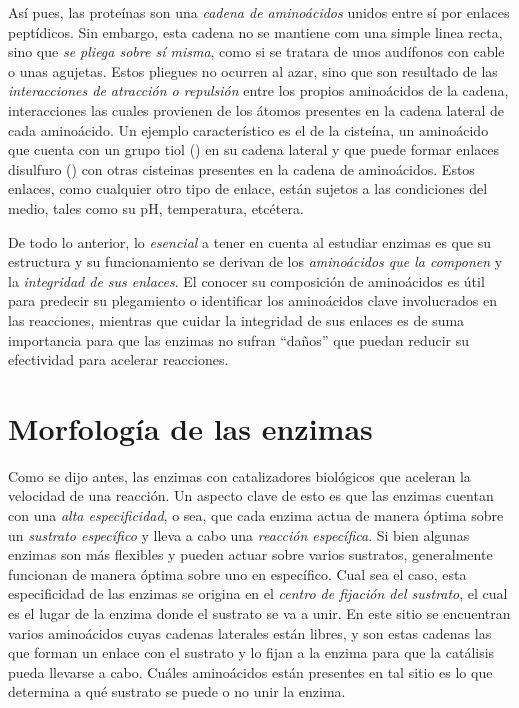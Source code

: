 Así pues, las proteínas son una \emph{cadena de aminoácidos} unidos entre sí por enlaces peptídicos. Sin embargo, esta cadena no se mantiene com una simple linea recta, sino que \emph{se pliega sobre sí misma}, como si se tratara de unos audífonos con cable o unas agujetas. Estos pliegues no ocurren al azar, sino que son resultado de las \emph{interacciones de atracción o repulsión} entre los propios aminoácidos de la cadena, interacciones las cuales provienen de los átomos presentes en la cadena lateral de cada aminoácido. Un ejemplo característico es el de la cisteína, un aminoácido que cuenta con un grupo tiol () en su cadena lateral y que puede formar enlaces disulfuro () con otras cisteinas presentes en la cadena de aminoácidos. Estos enlaces, como cualquier otro tipo de enlace, están sujetos a las condiciones del medio, tales como su pH, temperatura, etcétera.

De todo lo anterior, lo \emph{esencial} a tener en cuenta al estudiar enzimas es que su estructura y su funcionamiento se derivan de los \emph{aminoácidos que la componen} y la \emph{integridad de sus enlaces}. El conocer su composición de aminoácidos es útil para predecir su plegamiento o identificar los aminoácidos clave involucrados en las reacciones, mientras que cuidar la integridad de sus enlaces es de suma importancia para que las enzimas no sufran ``daños'' que puedan reducir su efectividad para acelerar reacciones.

\section{Morfología de las enzimas}

Como se dijo antes, las enzimas con catalizadores biológicos que aceleran la velocidad de una reacción. Un aspecto clave de esto es que las enzimas cuentan con una \emph{alta especificidad}, o sea, que cada enzima actua de manera óptima sobre un \emph{sustrato específico} y lleva a cabo una \emph{reacción específica}. Si bien algunas enzimas son más flexibles y pueden actuar sobre varios sustratos, generalmente funcionan de manera óptima sobre uno en específico. Cual sea el caso, esta especificidad de las enzimas se origina en el \emph{centro de fijación del sustrato}, el cual es el lugar de la enzima donde el sustrato se va a unir. En este sitio se encuentran varios aminoácidos cuyas cadenas laterales están libres, y son estas cadenas las que forman un enlace con el sustrato y lo fijan a la enzima para que la catálisis pueda llevarse a cabo. Cuáles aminoácidos están presentes en tal sitio es lo que determina a qué sustrato se puede o no unir la enzima.


